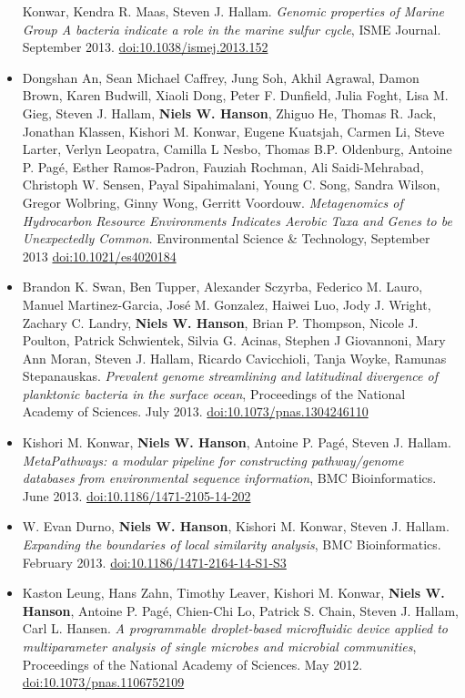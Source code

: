 \documentclass[print]{hanson_cv} %
\begin{document}
\begin{itemize}
  Konwar, Kendra R. Maas, Steven J. Hallam. \emph{Genomic properties of
  Marine Group A bacteria indicate a role in the marine sulfur cycle},
  ISME Journal. September 2013.
  \href{http://dx.doi.org/10.1038/ismej.2013.152}{doi:10.1038/ismej.2013.152}
\item
  Dongshan An, Sean Michael Caffrey, Jung Soh, Akhil Agrawal, Damon
  Brown, Karen Budwill, Xiaoli Dong, Peter F. Dunfield, Julia Foght,
  Lisa M. Gieg, Steven J. Hallam, \textbf{Niels W. Hanson}, Zhiguo He,
  Thomas R. Jack, Jonathan Klassen, Kishori M. Konwar, Eugene Kuatsjah,
  Carmen Li, Steve Larter, Verlyn Leopatra, Camilla L Nesbo, Thomas B.P.
  Oldenburg, Antoine P. Pag\'{e}, Esther Ramos-Padron, Fauziah Rochman, Ali
  Saidi-Mehrabad, Christoph W. Sensen, Payal Sipahimalani, Young C.
  Song, Sandra Wilson, Gregor Wolbring, Ginny Wong, Gerritt Voordouw.
   \emph{Metagenomics of Hydrocarbon Resource Environments Indicates Aerobic
  Taxa and Genes to be Unexpectedly Common.} Environmental Science
  \& Technology, September 2013
  \href{http://dx.doi.org/10.1021/es4020184}{doi:10.1021/es4020184}
\item
  Brandon K. Swan, Ben Tupper, Alexander Sczyrba, Federico M. Lauro,
  Manuel Martinez-Garcia, Jos\'{e} M. Gonzalez, Haiwei Luo, Jody J. Wright,
  Zachary C. Landry, \textbf{Niels W. Hanson}, Brian P. Thompson, Nicole
  J. Poulton, Patrick Schwientek, Silvia G. Acinas, Stephen J
  Giovannoni, Mary Ann Moran, Steven J. Hallam, Ricardo Cavicchioli,
  Tanja Woyke, Ramunas Stepanauskas. \emph{Prevalent genome streamlining
  and latitudinal divergence of planktonic bacteria in the surface
  ocean}, Proceedings of the National Academy of Sciences. July 2013.
  \href{http://dx.doi.org/10.1073/pnas.1304246110}{doi:10.1073/pnas.1304246110}
\item
  Kishori M. Konwar, \textbf{Niels W. Hanson}, Antoine P. Pag\'{e}, Steven
  J. Hallam. \emph{MetaPathways: a modular pipeline for constructing
  pathway/genome databases from environmental sequence information}, BMC
  Bioinformatics. June 2013. \href{http://dx.doi.org/10.1186/1471-2105-14-202}{doi:10.1186/1471-2105-14-202}
\item
  W. Evan Durno, \textbf{Niels W. Hanson}, Kishori M. Konwar, Steven J.
  Hallam. \emph{Expanding the boundaries of local similarity analysis}, BMC Bioinformatics.
  February 2013. \href{http://dx.doi.org/10.1186/1471-2164-14-S1-S3}{doi:10.1186/1471-2164-14-S1-S3}
\item
  Kaston Leung, Hans Zahn, Timothy Leaver, Kishori M. Konwar,
  \textbf{Niels W. Hanson}, Antoine P. Pag\'{e}, Chien-Chi Lo, Patrick S.
  Chain, Steven J. Hallam, Carl L. Hansen. \emph{A programmable
  droplet-based microfluidic device applied to multiparameter analysis
  of single microbes and microbial communities}, Proceedings of the
  National Academy of Sciences. May 2012.
  \href{http://dx.doi.org/10.1073/pnas.1106752109}{doi:10.1073/pnas.1106752109}
\end{itemize}
\end{document}
